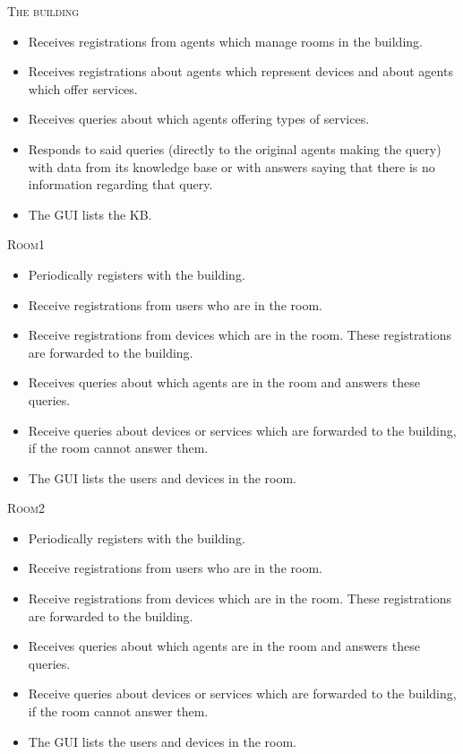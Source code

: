 \documentclass[a4paper, 12pt, twoside]{article}
\begin{document}


\textsc{The building}
\begin{itemize}
	\item Receives registrations from agents which manage rooms in the building.
	\item Receives registrations about agents which represent devices and about agents which offer services.
	\item Receives queries about which agents offering types of services.
	\item Responds to said queries (directly to the original agents making the query) with data from its knowledge base or with answers saying that there is no information regarding that query.
	\item The GUI lists the KB.
\end{itemize}


\textsc{Room1}
\begin{itemize}
	\item Periodically registers with the building.
	\item Receive registrations from users who are in the room.
	\item Receive registrations from devices which are in the room. These registrations are forwarded to the building.
	\item Receives queries about which agents are in the room and answers these queries.
	\item Receive queries about devices or services which are forwarded to the building, if the room cannot answer them.
	\item The GUI lists the users and devices in the room.
\end{itemize}


\textsc{Room2}
\begin{itemize}
	\item Periodically registers with the building.
	\item Receive registrations from users who are in the room.
	\item Receive registrations from devices which are in the room. These registrations are forwarded to the building.
	\item Receives queries about which agents are in the room and answers these queries.
	\item Receive queries about devices or services which are forwarded to the building, if the room cannot answer them.
	\item The GUI lists the users and devices in the room.
\end{itemize}
\end{document}

